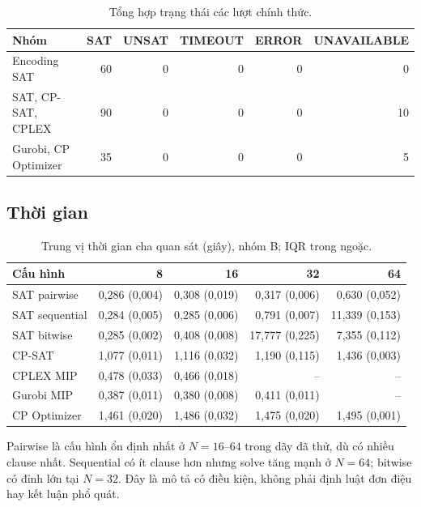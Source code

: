 \documentclass[a4paper,fleqn]{cas-sc}
\begin{document}
\begin{table}[t]\centering
\caption{Tổng hợp trạng thái các lượt chính thức.}\label{tab:status}
\begin{tabular}{lrrrrr}\toprule
Nhóm & SAT & UNSAT & TIMEOUT & ERROR & UNAVAILABLE\\\midrule
Encoding SAT & 60 & 0 & 0 & 0 & 0\\
SAT, CP-SAT, CPLEX & 90 & 0 & 0 & 0 & 10\\
Gurobi, CP Optimizer & 35 & 0 & 0 & 0 & 5\\\bottomrule
\end{tabular}
\end{table}

\subsection{Thời gian}
\begin{table}[t]\centering\caption{Trung vị thời gian cha quan sát (giây), nhóm B; IQR trong ngoặc.}\label{tab:time}
\begin{tabular}{lrrrr}\toprule
Cấu hình & 8 & 16 & 32 & 64\\\midrule
SAT pairwise &0,286 (0,004)&0,308 (0,019)&0,317 (0,006)&0,630 (0,052)\\
SAT sequential&0,284 (0,005)&0,285 (0,006)&0,791 (0,007)&11,339 (0,153)\\
SAT bitwise&0,285 (0,002)&0,408 (0,008)&17,777 (0,225)&7,355 (0,112)\\
CP-SAT&1,077 (0,011)&1,116 (0,032)&1,190 (0,115)&1,436 (0,003)\\
CPLEX MIP&0,478 (0,033)&0,466 (0,018)&--&--\\
Gurobi MIP&0,387 (0,011)&0,380 (0,008)&0,411 (0,011)&--\\
CP Optimizer&1,461 (0,020)&1,486 (0,032)&1,475 (0,020)&1,495 (0,001)\\\bottomrule
\end{tabular}\end{table}
Pairwise là cấu hình ổn định nhất ở $N=16$--$64$ trong dãy đã thử, dù có nhiều clause nhất. Sequential có ít clause hơn nhưng solve tăng mạnh ở $N=64$; bitwise có đỉnh lớn tại $N=32$. Đây là mô tả có điều kiện, không phải định luật đơn điệu hay kết luận phổ quát.
\end{document}
